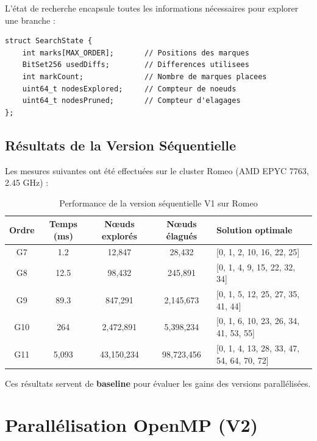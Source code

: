 \documentclass[12pt,a4paper,twoside]{report}
\begin{document}
L'état de recherche encapsule toutes les informations nécessaires pour explorer une branche :

\begin{lstlisting}[caption={Structure SearchState pour la recherche}]
struct SearchState {
    int marks[MAX_ORDER];       // Positions des marques
    BitSet256 usedDiffs;        // Differences utilisees
    int markCount;              // Nombre de marques placees
    uint64_t nodesExplored;     // Compteur de noeuds
    uint64_t nodesPruned;       // Compteur d'elagages
};
\end{lstlisting}

\section{Résultats de la Version Séquentielle}

Les mesures suivantes ont été effectuées sur le cluster Romeo (AMD EPYC 7763, 2.45 GHz) :

\begin{table}[htbp]
\centering
\caption{Performance de la version séquentielle V1 sur Romeo}
\label{tab:v1-perf}
\begin{tabular}{@{}ccccl@{}}
\toprule
\textbf{Ordre} & \textbf{Temps (ms)} & \textbf{Nœuds explorés} & \textbf{Nœuds élagués} & \textbf{Solution optimale} \\
\midrule
G7 & 1.2 & 12,847 & 28,432 & [0, 1, 2, 10, 16, 22, 25] \\
G8 & 12.5 & 98,432 & 245,891 & [0, 1, 4, 9, 15, 22, 32, 34] \\
G9 & 89.3 & 847,291 & 2,145,673 & [0, 1, 5, 12, 25, 27, 35, 41, 44] \\
G10 & 264 & 2,472,891 & 5,398,234 & [0, 1, 6, 10, 23, 26, 34, 41, 53, 55] \\
G11 & 5,093 & 43,150,234 & 98,723,456 & [0, 1, 4, 13, 28, 33, 47, 54, 64, 70, 72] \\
\bottomrule
\end{tabular}
\end{table}

Ces résultats servent de \textbf{baseline} pour évaluer les gains des versions parallélisées.


\chapter{Parallélisation OpenMP (V2)}
\end{document}

